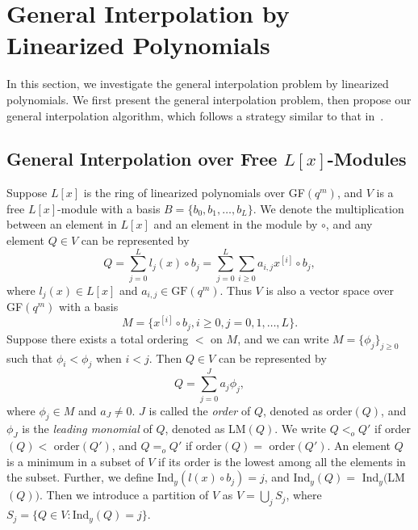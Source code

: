 \documentclass[11pt,onecolumn,draftcls]{IEEEtran}
\begin{document}
\section{General Interpolation by Linearized Polynomials}
\label{sec:generalinterpo}

In this section, we investigate the general interpolation problem by linearized polynomials. We first present the general interpolation problem, then propose our general interpolation algorithm, which follows a strategy similar to that in~\cite{WangMcEliece05}.


\subsection{General Interpolation over Free $L[x]$-Modules} \label{section: GeneralInterpolation}

Suppose $L[x]$ is the ring of linearized polynomials over GF$(q^m)$, and $V$ is a free $L[x]$-module with a basis $B=\{b_{0}, b_{1}, \ldots, b_{L} \}$.  We denote the multiplication between an element in $L[x]$ and an element in the module by $\circ$, and any element $Q\in V$ can be represented by
\begin{equation} \label{equ: GIexpand}
Q = \sum_{j=0}^L l_{j}(x) \circ b_{j} = \sum_{j=0}^{L} \sum_{i \geq 0} a_{i,j}x^{[i]} \circ b_{j},
\end{equation}
where $l_{j}(x) \in L[x]$ and $a_{i,j} \in \textrm{GF}(q^m)$. Thus $V$ is also a vector space over GF$(q^m)$ with a basis
\begin{equation} \label{equ: GIM}
M = \{ x^{[i]} \circ b_{j}, i\ge 0, j = 0, 1, \ldots, L\}.
\end{equation}
Suppose there exists a total ordering $<$ on $M$, and we can write $M = \{\phi_j\}_{j \ge 0}$ such that $\phi_i < \phi_j$ when $i < j$. Then $Q \in V$ can be represented by
\begin{equation} \label{equ: orderM}
Q = \sum_{j = 0}^{J} a_{j} \phi_{j},
\end{equation}
where $\phi_{j} \in M$ and $a_{J} \ne 0$. $J$ is called the \emph{order} of $Q$, denoted as order$(Q)$, and $\phi_J$ is the \emph{leading monomial} of $Q$, denoted as LM$(Q)$. We write $Q <_o Q'$ if order$(Q) <$ order$(Q')$, and $Q =_o Q'$ if order$(Q) =$ order$(Q')$. An element $Q$ is a minimum in a subset of $V$ if its order is the lowest among all the elements in the subset. Further, we define Ind$_y(l(x)\circ b_j) = j$, and Ind$_y(Q) = $ Ind$_y($LM$(Q))$. Then we introduce a partition of $V$ as $V = \bigcup_jS_j$, where $S_j = \{Q \in V: \textrm{Ind}_y(Q) = j \}$.
\end{document}
